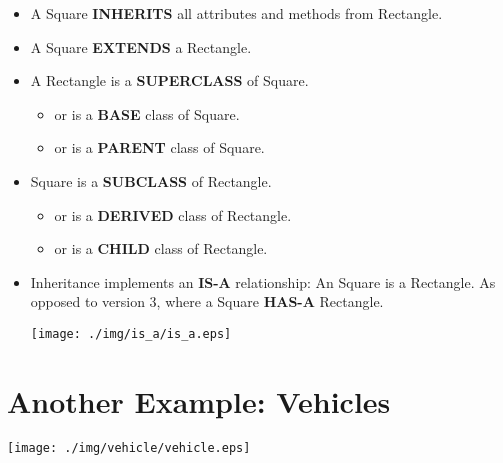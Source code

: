 \documentclass[a4paper, 9pt]{extarticle}
\begin{document}
\begin{itemize}

  \item A Square \textbf{INHERITS} all attributes and methods from Rectangle.

  \item A Square \textbf{EXTENDS} a Rectangle.

  \item A Rectangle is a \textbf{SUPERCLASS} of Square.

    \begin{itemize}

      \item or is a \textbf{BASE} class of Square.

      \item or is a \textbf{PARENT} class of Square.

    \end{itemize}

  \item Square is a \textbf{SUBCLASS} of Rectangle.

    \begin{itemize}

      \item or is a \textbf{DERIVED} class of Rectangle.

      \item or is a \textbf{CHILD} class of Rectangle.

    \end{itemize}

  \item Inheritance implements an \textbf{IS-A} relationship: An Square is a
    Rectangle.  As opposed to version 3, where a Square \textbf{HAS-A}
    Rectangle.

    \begin{center}
      \texttt{[image: ./img/is\_a/is\_a.eps]}
    \end{center}

\end{itemize}







\section{Another Example: Vehicles}

\begin{center}
  \texttt{[image: ./img/vehicle/vehicle.eps]}
\end{center}
\end{document}
